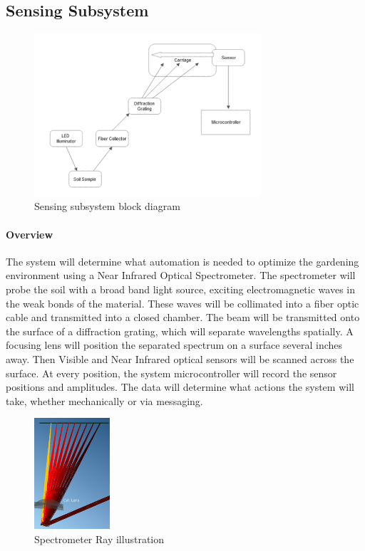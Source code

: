 \subsection{Sensing Subsystem}
\begin{figure}[H]
    \caption{Sensing subsystem block diagram}
    \centering
    \includegraphics[width=0.75\textwidth]{images/OpticsBlockDiagram.png}
\end{figure}


\paragraph{Overview} The system will determine what automation is needed to optimize the gardening environment using a Near Infrared Optical Spectrometer. The spectrometer will probe the soil with a broad band light source, exciting electromagnetic waves in the weak bonds of the material. These waves will be collimated into a fiber optic cable and transmitted into a closed chamber. The beam will be transmitted onto the surface of a diffraction grating, which will separate wavelengths spatially. A focusing lens will position the separated spectrum on a surface several inches away. Then Visible and Near Infrared optical sensors will be scanned across the surface. At every position, the system microcontroller will record the sensor positions and amplitudes. The data will determine what actions the system will take, whether mechanically or via messaging.

\begin{figure}[H]
    \caption{Spectrometer Ray illustration}
    \centering
    \includegraphics[width=0.25\textwidth]{images/YuanCaoSpectrometer.png}
\end{figure}


